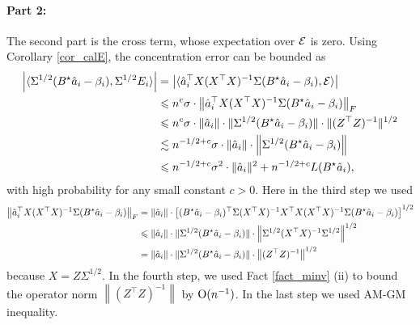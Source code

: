 	\paragraph{Part 2:} The second part is the cross term, whose expectation over $\cE$ is zero. Using Corollary \ref{cor_calE}, the concentration error can be bounded as 
	\begin{align*}
		{\left| {\langle \Sigma^{1/2}(B^{\star} \hat{a}_i - \beta_i), \Sigma^{1/2}E_i \rangle} \right|} &= {\left| {\langle \hat a_i^\top X(X^\top X)^{-1}\Sigma (B^{\star} \hat{a}_i - \beta_i), \mathcal E \rangle} \right|} \\
		&\leqslant n^{c}\sigma \cdot \left\| \hat a_i^\top X(X^\top X)^{-1}\Sigma (B^{\star} \hat{a}_i - \beta_i) \right\|_{F}\\
		&\leqslant n^{c}\sigma \cdot\|\hat a_i\| \cdot  \|\Sigma^{1/2}(B^{\star} \hat{a}_i - \beta_i)\| \cdot \| (Z^\top Z)^{-1} \|^{1/2} \\
		&\lesssim n^{-1/2+c}\sigma \cdot\|\hat a_i\| \cdot \left\| \Sigma^{1/2}(B^{\star} \hat{a}_i - \beta_i) \right\| \\
		&\leqslant n^{-1/2+c}\sigma^2  \cdot\|\hat a_i\|^2 + n^{-1/2+c} L(B^{\star} \hat{a}_i), 
	\end{align*}
	with high probability for any small constant $c>0$. Here in the third step we used 
	\begin{align*}
	\left\| \hat a_i^\top X(X^\top X)^{-1}\Sigma (B^{\star} \hat{a}_i - \beta_i) \right\|_{F} &=\|\hat a_i\|\cdot \left[ (B^{\star} \hat{a}_i - \beta_i)^\top \Sigma (X^\top X)^{-1}X^\top X(X^\top X)^{-1}\Sigma (B^{\star} \hat{a}_i - \beta_i) \right]^{1/2} \\
	&\leqslant \|\hat a_i\|\cdot  \|\Sigma^{1/2}(B^{\star} \hat{a}_i - \beta_i)\|  \cdot \left\| \Sigma^{1/2}(X^\top X)^{-1}\Sigma ^{1/2} \right\|^{1/2} \\
	&= \|\hat a_i\|\cdot  \|\Sigma^{1/2}(B^{\star} \hat{a}_i - \beta_i)\|  \cdot \left\| (Z^\top Z)^{-1}\right\|^{1/2}
	\end{align*}
	because $X=Z\Sigma^{1/2}$. In the fourth step, we used Fact \ref{fact_minv} (ii) to bound the operator norm $\left\| (Z^\top Z)^{-1}\right\|$ by $\operatorname{O}(n^{-1})$. In the last step we used AM-GM inequality. 
	
	\iffalse
	Next, we use the fact that the spectral norm of $\cE$ is at most $\sigma \cdot p^{\e}$.
	Hence, the spectral norm of $\Sigma^{1/2} E_i$ is at most
		\[ \sigma \cdot p^{\e} \cdot \norm{\Sigma^{1/2} (X^{\top} X)^{-1} X^{\top}} \cdot \norm{\hat{a}_i}. \]
	Therefore, the cross term is bounded by $\sigma \cdot p^{\e}$ times
	\begin{align*}
			& \bignorm{\Sigma^{1/2} (B^{\star} \hat{a}_i - \beta_i)} \cdot \norm{\Sigma^{1/2} (X^{\top} X)^{-1} X^{\top}} \cdot \norm{\hat{a}_i} \\
		\le & \bignorm{\Sigma^{1/2} (B^{\star} \hat{a}_i - \beta_i)}^2 + \norm{\hat{a}_i}^2 \cdot \bignorm{\Sigma^{1/2} (X^{\top} X)^{-1} X^{\top}}^2 \tag{by Cauchy-Shwartz inequality} \\
		\le & \bignorm{\Sigma^{1/2}(B^{\star} \hat{a}_i - \beta_i)} + \norm{\hat{a}_i}^2 \cdot \bigtr{\Sigma (X^{\top} X)^{-1}}.
	\end{align*}
	\fi

